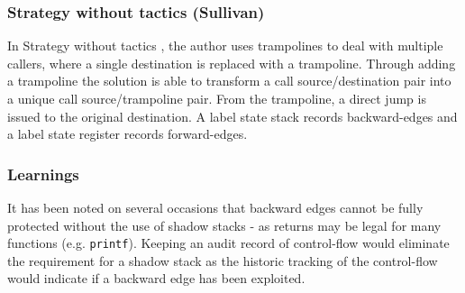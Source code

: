 \subsubsection{Strategy without tactics (Sullivan)}
In Strategy without tactics \cite{Davi2015}, the author uses trampolines to deal with multiple callers, where a single destination is replaced with a trampoline. Through adding a trampoline the solution is able to transform a call source\slash destination pair into a unique call source\slash trampoline pair. From the trampoline, a direct jump is issued to the original destination. A label state stack records backward-edges and a label state register records forward-edges. 

\subsubsection{Learnings}
It has been noted on several occasions that backward edges cannot be fully protected without the use of shadow stacks - as returns may be legal for many functions (e.g. \verb|printf|). Keeping an audit record of control-flow would eliminate the requirement for a shadow stack as the historic tracking of the control-flow would indicate if a backward edge has been exploited.